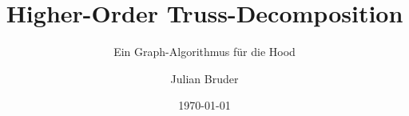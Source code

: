 \title[Higher-Order Truss-Decomposition]{Higher-Order Truss-Decomposition}
\subtitle{Ein Graph-Algorithmus für die Hood}
\author{Julian Bruder}
\newcommand{\faculty}{Fakultät Informatik und Medien}
\newcommand{\university}{HTWK Leipzig}
\newcommand{\universityLong}{Hochschule für Technik, Wirtschaft und Kultur Leipzig}
\date{\today}





